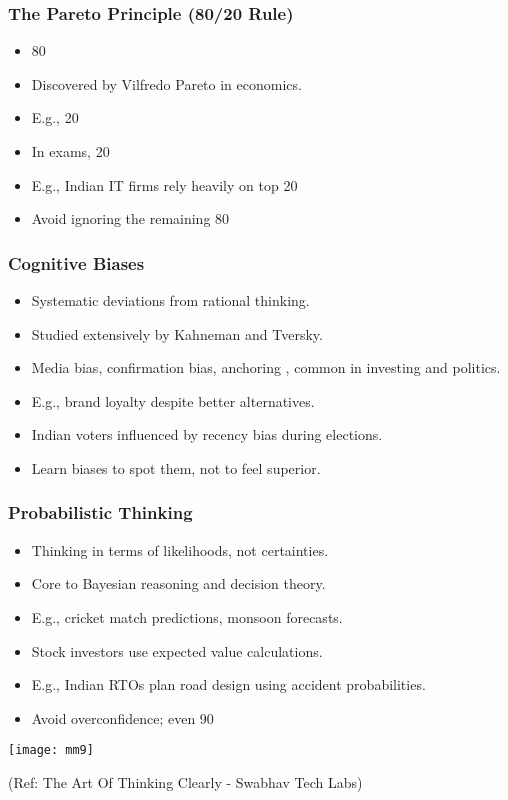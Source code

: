 \begin{frame}[fragile]\frametitle{The Pareto Principle (80/20 Rule)}
  \begin{itemize}
    \item 80%
    \item Discovered by Vilfredo Pareto in economics.
    \item E.g., 20%
    \item In exams, 20%
    \item E.g., Indian IT firms rely heavily on top 20%
    \item Avoid ignoring the remaining 80%
  \end{itemize}
\end{frame}

\begin{frame}[fragile]\frametitle{Cognitive Biases}
  \begin{itemize}
    \item Systematic deviations from rational thinking.
    \item Studied extensively by Kahneman and Tversky.
    \item Media bias, confirmation bias, anchoring , common in investing and politics.
    \item E.g., brand loyalty despite better alternatives.
    \item Indian voters influenced by recency bias during elections.
    \item Learn biases to spot them, not to feel superior.
  \end{itemize}
\end{frame}

\begin{frame}[fragile]\frametitle{Probabilistic Thinking}
  \begin{itemize}
    \item Thinking in terms of likelihoods, not certainties.
    \item Core to Bayesian reasoning and decision theory.
    \item E.g., cricket match predictions, monsoon forecasts.
    \item Stock investors use expected value calculations.
    \item E.g., Indian RTOs plan road design using accident probabilities.
    \item Avoid overconfidence; even 90%
  \end{itemize}
  
	\begin{center}
	\texttt{[image: mm9]}
	\end{center}
	
{\tiny (Ref: The Art Of Thinking Clearly - Swabhav Tech Labs)}      
\end{frame}

